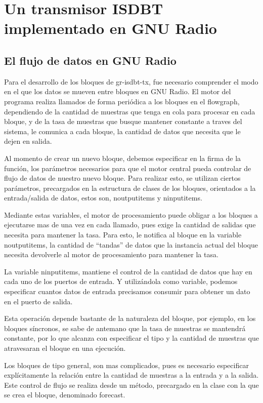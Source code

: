 \chapter{Un transmisor ISDBT implementado en GNU Radio}

\section{El flujo de datos en GNU Radio}

Para el desarrollo de los bloques de gr-isdbt-tx, fue necesario comprender el modo en el que los datos se mueven entre bloques en GNU Radio. El motor del programa realiza llamados de forma periódica a los bloques en el flowgraph, dependiendo de la cantidad de muestras que tenga en cola para procesar en cada bloque, y de la tasa de muestras que busque mantener constante a traves del sistema, le comunica a cada bloque, la cantidad de datos que necesita que le dejen en salida.  

Al momento de crear un nuevo bloque, debemos especificar en la firma de la función, los parámetros necesarios para que el motor central pueda controlar de flujo de datos de nuestro nuevo bloque. Para realizar esto, se utilizan ciertos parámetros, precargados en la estructura de clases de los bloques, orientados a la entrada/salida de datos, estos son,  noutputitems y ninputitems. 

Mediante estas variables, el motor de procesamiento puede obligar a los bloques a ejecutarse mas de una vez en cada llamado, pues exige la cantidad de salidas que necesita para mantener la tasa. Para esto, le notifica al bloque en la variable noutputitems, la cantidad de “tandas” de datos que la instancia actual del bloque necesita devolverle al motor de procesamiento para mantener la tasa. 

La variable ninputitems, mantiene el control de la cantidad de datos que hay en cada uno de los puertos de entrada. Y utilizándola como variable, podemos especificar cuantos datos de entrada precisamos consumir para obtener un dato en el puerto de salida.

Esta operación depende bastante de la naturaleza del bloque, por ejemplo, en los bloques síncronos, se sabe de antemano que la tasa de muestras se mantendrá constante, por lo que alcanza con especificar el tipo y la cantidad de muestras que atravesaran el bloque en una ejecución. 

Los bloques de tipo general, son mas complicados, pues es necesario especificar explícitamente la relación entre la cantidad de muestras a la entrada y a la salida. Este control de flujo se realiza desde un método, precargado en la clase con la que se crea el bloque, denominado forecast.

